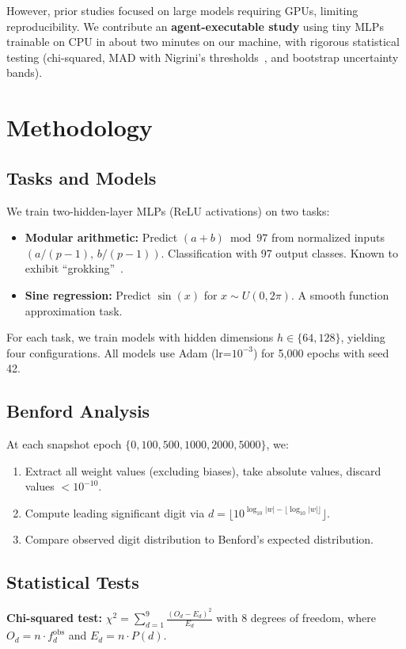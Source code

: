 \documentclass[11pt]{article}
\begin{document}
However, prior studies focused on large models requiring GPUs, limiting reproducibility.
We contribute an \textbf{agent-executable study} using tiny MLPs trainable on CPU in about two minutes on our machine, with rigorous statistical testing (chi-squared, MAD with Nigrini's thresholds~\cite{nigrini2012}, and bootstrap uncertainty bands).

\section{Methodology}

\subsection{Tasks and Models}
We train two-hidden-layer MLPs (ReLU activations) on two tasks:
\begin{itemize}
    \item \textbf{Modular arithmetic:} Predict $(a + b) \bmod 97$ from normalized inputs $(a/(p{-}1),\, b/(p{-}1))$. Classification with 97 output classes. Known to exhibit ``grokking''~\cite{power2022}.
    \item \textbf{Sine regression:} Predict $\sin(x)$ for $x \sim U(0, 2\pi)$. A smooth function approximation task.
\end{itemize}

For each task, we train models with hidden dimensions $h \in \{64, 128\}$, yielding four configurations. All models use Adam (lr=$10^{-3}$) for 5{,}000 epochs with seed 42.

\subsection{Benford Analysis}
At each snapshot epoch $\{0, 100, 500, 1000, 2000, 5000\}$, we:
\begin{enumerate}
    \item Extract all weight values (excluding biases), take absolute values, discard values $< 10^{-10}$.
    \item Compute leading significant digit via $d = \lfloor 10^{\log_{10}|w| - \lfloor\log_{10}|w|\rfloor}\rfloor$.
    \item Compare observed digit distribution to Benford's expected distribution.
\end{enumerate}

\subsection{Statistical Tests}
\textbf{Chi-squared test:} $\chi^2 = \sum_{d=1}^{9} \frac{(O_d - E_d)^2}{E_d}$ with 8 degrees of freedom, where $O_d = n \cdot f_d^{\text{obs}}$ and $E_d = n \cdot P(d)$.
\end{document}
